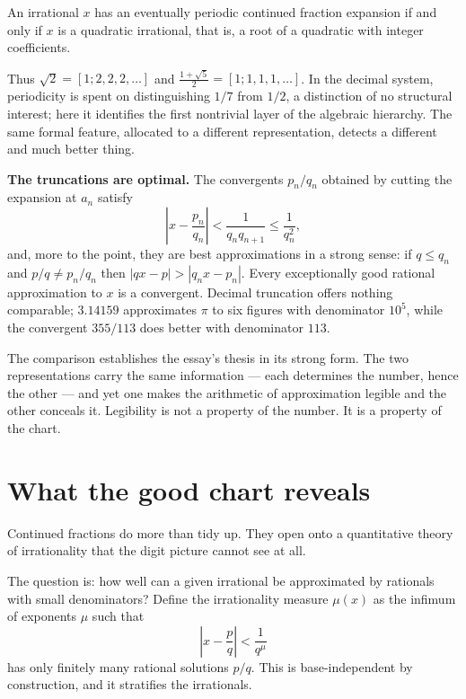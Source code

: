 \documentclass{essay}
\begin{document}
\begin{theorem}[Lagrange]
  An irrational \(x\) has an eventually periodic continued fraction expansion if
  and only if \(x\) is a quadratic irrational, that is, a root of a quadratic with
  integer coefficients.
\end{theorem}

Thus \(\sqrt{2} = [1;2,2,2,\ldots]\) and
\(\tfrac{1+\sqrt{5}}{2} = [1;1,1,1,\ldots]\). In the decimal system, periodicity is
spent on distinguishing \(1/7\) from \(1/2\), a distinction of no structural
interest; here it identifies the first nontrivial layer of the algebraic
hierarchy. The same formal feature, allocated to a different representation,
detects a different and much better thing.

\medskip
\noindent\textbf{The truncations are optimal.} The convergents \(p_{n}/q_{n}\)
obtained by cutting the expansion at \(a_{n}\) satisfy
\[ \left| x - \frac{p_{n}}{q_{n}} \right| < \frac{1}{q_{n} q_{n+1}} \le \frac{1}{q_{n}^{2}}, \]
and, more to the point, they are best approximations in a strong sense: if
\(q \le q_{n}\) and \(p/q \ne p_{n}/q_{n}\) then \(|qx - p| > |q_{n} x - p_{n}|\). Every
exceptionally good rational approximation to \(x\) is a convergent. Decimal
truncation offers nothing comparable; \(3.14159\) approximates \(\pi\) to six
figures with denominator \(10^{5}\), while the convergent \(355/113\) does better
with denominator \(113\).

The comparison establishes the essay's thesis in its strong form. The two
representations carry the same information --- each determines the number,
hence the other --- and yet one makes the arithmetic of approximation legible
and the other conceals it. Legibility is not a property of the number. It is a
property of the chart.

\section{What the good chart reveals}

Continued fractions do more than tidy up. They open onto a quantitative theory
of irrationality that the digit picture cannot see at all.

The question is: how well can a given irrational be approximated by rationals
with small denominators? Define the irrationality measure \(\mu(x)\) as the
infimum of exponents \(\mu\) such that
\[ \left| x - \frac{p}{q} \right| < \frac{1}{q^{\mu}} \]
has only finitely many rational solutions \(p/q\). This is base-independent by
construction, and it stratifies the irrationals.
\end{document}
